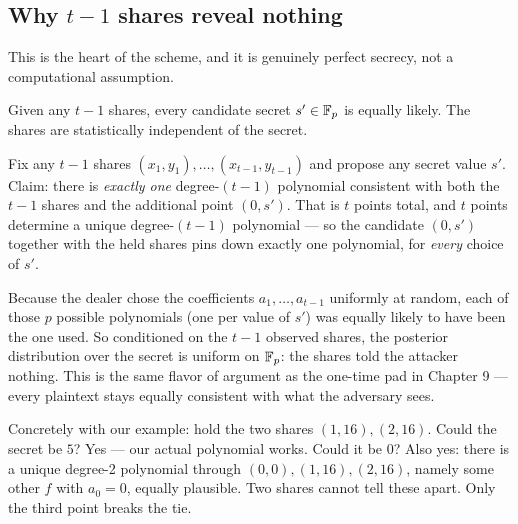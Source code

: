 \subsection{Why $t-1$ shares reveal nothing}
\label{ch32:perfect}

This is the heart of the scheme, and it is genuinely perfect secrecy, not a computational assumption.

\begin{theorem}
\label{ch32:thm-perfect}
Given any $t-1$ shares, every candidate secret $s' \in \mathbb{F}_p$ is equally likely. The shares are statistically independent of the secret.
\end{theorem}

\begin{whybox}
Fix any $t-1$ shares $(x_1,y_1),\dots,(x_{t-1},y_{t-1})$ and propose any secret value $s'$. Claim: there is \emph{exactly one} degree-$(t-1)$ polynomial consistent with both the $t-1$ shares and the additional point $(0, s')$. That is $t$ points total, and $t$ points determine a unique degree-$(t-1)$ polynomial --- so the candidate $(0,s')$ together with the held shares pins down exactly one polynomial, for \emph{every} choice of $s'$.

Because the dealer chose the coefficients $a_1,\dots,a_{t-1}$ uniformly at random, each of those $p$ possible polynomials (one per value of $s'$) was equally likely to have been the one used. So conditioned on the $t-1$ observed shares, the posterior distribution over the secret is uniform on $\mathbb{F}_p$: the shares told the attacker nothing. This is the same flavor of argument as the one-time pad in Chapter 9 --- every plaintext stays equally consistent with what the adversary sees.
\end{whybox}

Concretely with our example: hold the two shares $(1,16),(2,16)$. Could the secret be $5$? Yes --- our actual polynomial works. Could it be $0$? Also yes: there is a unique degree-2 polynomial through $(0,0),(1,16),(2,16)$, namely some other $f$ with $a_0 = 0$, equally plausible. Two shares cannot tell these apart. Only the third point breaks the tie.

